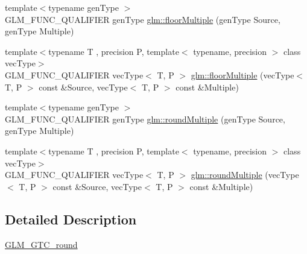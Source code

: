 \begin{DoxyCompactItemize}
\item 
{\footnotesize template$<$typename gen\+Type $>$ }\\G\+L\+M\+\_\+\+F\+U\+N\+C\+\_\+\+Q\+U\+A\+L\+I\+F\+I\+ER gen\+Type \hyperlink{group__gtc__round_ga9eafb9dbedf84e5cece65c2fe9d5631d}{glm\+::floor\+Multiple} (gen\+Type Source, gen\+Type Multiple)
\item 
{\footnotesize template$<$typename T , precision P, template$<$ typename, precision $>$ class vec\+Type$>$ }\\G\+L\+M\+\_\+\+F\+U\+N\+C\+\_\+\+Q\+U\+A\+L\+I\+F\+I\+ER vec\+Type$<$ T, P $>$ \hyperlink{group__gtc__round_ga6912db42d43873fe1dedb3aed2b7a239}{glm\+::floor\+Multiple} (vec\+Type$<$ T, P $>$ const \&Source, vec\+Type$<$ T, P $>$ const \&Multiple)
\item 
{\footnotesize template$<$typename gen\+Type $>$ }\\G\+L\+M\+\_\+\+F\+U\+N\+C\+\_\+\+Q\+U\+A\+L\+I\+F\+I\+ER gen\+Type \hyperlink{group__gtc__round_ga6739d1de04b2cea7c78675b365644bce}{glm\+::round\+Multiple} (gen\+Type Source, gen\+Type Multiple)
\item 
{\footnotesize template$<$typename T , precision P, template$<$ typename, precision $>$ class vec\+Type$>$ }\\G\+L\+M\+\_\+\+F\+U\+N\+C\+\_\+\+Q\+U\+A\+L\+I\+F\+I\+ER vec\+Type$<$ T, P $>$ \hyperlink{group__gtc__round_ga10a8ab7b254257b607b6a3fc68c3e661}{glm\+::round\+Multiple} (vec\+Type$<$ T, P $>$ const \&Source, vec\+Type$<$ T, P $>$ const \&Multiple)
\end{DoxyCompactItemize}


\subsection{Detailed Description}
\hyperlink{group__gtc__round}{G\+L\+M\+\_\+\+G\+T\+C\+\_\+round} 